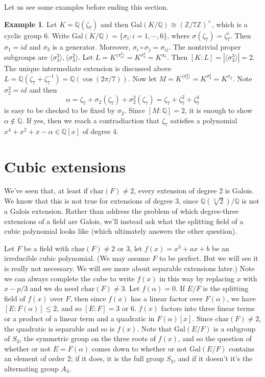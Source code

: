 \documentclass[12pt]{report}
\theoremstyle{definition}
\newtheorem{example}[theorem]{Example}
\newcommand{\charr}{\text{char}}
\newcommand{\Gal}{\text{Gal}}
\newcommand{\ZZ}{\mathbb{Z}}
\newcommand{\QQ}{\mathbb{Q}}
\begin{document}
Let us see some examples before ending this section.
\begin{example}
	Let $K=\QQ(\zeta_7)$ and then $\Gal(K/\QQ)\cong (\ZZ/7\ZZ)^\times$, which is a cyclic group 6. Write $\Gal(K/\QQ)=\{\sigma_i: i=1,\cdots,6\}$, where $\sigma(\zeta_7)=\zeta_7^i$. Then $\sigma_1=id$ and $\sigma_3$ is a generator. Moreover, $\sigma_i\circ\sigma_j=\sigma_{ij}$. The nontrivial proper subgroups are $\langle \sigma_3^3 \rangle, \langle \sigma_3^2 \rangle$. Let $L=K^{\langle \sigma_3^3 \rangle}=K^{\sigma_3^3}=K^{\sigma_6}$. Then $[K:L]=|\langle \sigma_3^3 \rangle|=2$. The unique intermediate extension is discussed above $L=\QQ(\zeta_7+\zeta_7^{-1})=\QQ(\cos(2\pi/7))$. Now let $M=K^{\langle \sigma_3^2 \rangle}=K^{\sigma_3^2}=K^{\sigma_2}$. Note $\sigma_2^3=id$ and then $$\alpha=\zeta_7+\sigma_2(\zeta_7)+\sigma_2^2(\zeta_7)=\zeta_7+\zeta_7^2+\zeta_7^4$$ is easy to be checked to be fixed by $\sigma_2$. Since $[M:\QQ]=2$, it is enough to show $\alpha\notin\QQ$. If yes, then we reach a contradiaction that $\zeta_7$ satisfies a polynomial $x^4+x^2+x-\alpha\in \QQ[x]$ of degree 4.
\end{example}

\section{Cubic extensions}

We've seen that, at least if $\charr(F) \not= 2$, every extension of degree 2 is Galois. We know that this is not true for extensions of degree 3, since $\QQ(\sqrt[3]{2})/\QQ$ is not a Galois extension. Rather than address the problem of which degree-three extensions of a field are Galois, we'll instead ask what the splitting field of a cubic polynomial looks like (which ultimately answers the other question).


Let $F$ be a field with $\charr(F) \not= 2$ or 3, let $f(x) = x^3 + ax + b$ be an irreducible cubic polynomial. (We may assume $F$ to be perfect. But we will see it is really not necessary. We will see more about separable extensions later.) Note we can always complete the cube to write $f(x)$ in this way by replacing $x$ with $x-p/3$ and we do need $\charr(F)\not=3$. Let $f(\alpha) = 0$. If $E/F$ is the splitting field of $f(x)$ over $F$, then since $f(x)$ has a linear factor over $F(\alpha)$, we have $[E : F(\alpha)] \leq 2$, and so $[E : F] = 3$ or 6. $f(x)$ factors into three linear terms or a product of a linear term and a quadratic in $F(\alpha)[x]$. Since $\charr(F) \not= 2$, the quadratic is separable and so is $f(x)$. Note that $\Gal(E/F)$ is a subgroup of $S_3$, the symmetric group on the three roots of $f(x)$, and so the question of whether or not $E = F(\alpha)$ comes down to whether or not $\Gal(E/F)$ contains an element of order 2; if it does, it is the full group $S_3$, and if it doesn't it's the alternating group $A_3$.
\end{document}
